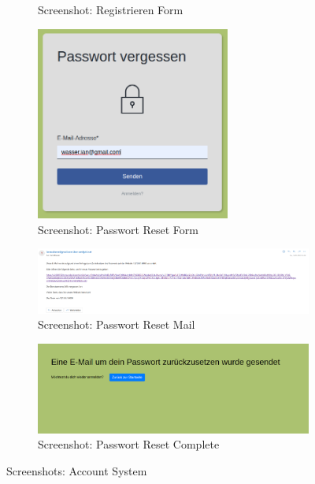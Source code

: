 \begin{figure}[htp]
\begin{subfigure}[b]{0.32\textwidth}
        \caption{Screenshot: Registrieren Form}
        \label{fig:r-register}
    \end{subfigure}
    \begin{subfigure}[b]{0.32\textwidth}
        \centering
        \includegraphics[width=0.7\textwidth]{images/Auth3.png}
        \caption{Screenshot: Passwort Reset Form}
        \label{fig:r-reset}
    \end{subfigure}
    \begin{subfigure}[b]{\textwidth}
        \centering
        \includegraphics[width=\textwidth]{images/Auth4.png}
        \caption{Screenshot: Passwort Reset Mail}
        \label{fig:r-reset-mail}
    \end{subfigure}
    \begin{subfigure}[b]{\textwidth}
        \centering
        \includegraphics[width=\textwidth]{images/Auth5.png}
        \caption{Screenshot: Passwort Reset Complete}
        \label{fig:r-reset-complete}
    \end{subfigure}
    \caption{Screenshots: Account System}
    \label{fig:r-auth}
\end{figure}

